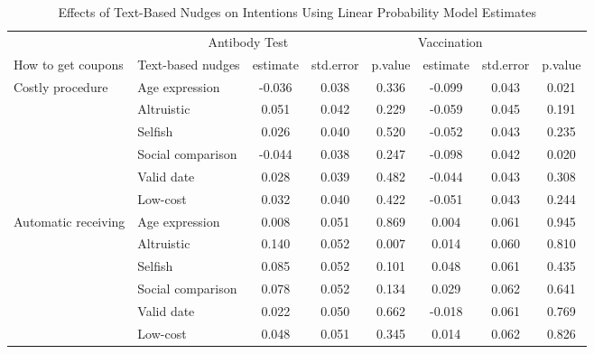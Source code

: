 \documentclass[
  11pt,
  a4paper,
]{article}
\begin{document}
\begin{table}

\caption{\label{tab:int-reg-ftest}Effects of Text-Based Nudges on Intentions Using Linear Probability Model Estimates}
\centering
\begin{tabular}[t]{>{\raggedright\arraybackslash}p{5em}lcccccc}
\toprule
\multicolumn{2}{c}{ } & \multicolumn{3}{c}{Antibody Test} & \multicolumn{3}{c}{Vaccination} \\
\cmidrule(l{3pt}r{3pt}){3-5} \cmidrule(l{3pt}r{3pt}){6-8}
How to get coupons & Text-based nudges & estimate & std.error & p.value & estimate  & std.error  & p.value \\
\midrule
Costly procedure & Age expression & -0.036 & 0.038 & 0.336 & -0.099 & 0.043 & 0.021\\
 & Altruistic & 0.051 & 0.042 & 0.229 & -0.059 & 0.045 & 0.191\\
 & Selfish & 0.026 & 0.040 & 0.520 & -0.052 & 0.043 & 0.235\\
 & Social comparison & -0.044 & 0.038 & 0.247 & -0.098 & 0.042 & 0.020\\
 & Valid date & 0.028 & 0.039 & 0.482 & -0.044 & 0.043 & 0.308\\
 & Low-cost & 0.032 & 0.040 & 0.422 & -0.051 & 0.043 & 0.244\\
Automatic receiving & Age expression & 0.008 & 0.051 & 0.869 & 0.004 & 0.061 & 0.945\\
 & Altruistic & 0.140 & 0.052 & 0.007 & 0.014 & 0.060 & 0.810\\
 & Selfish & 0.085 & 0.052 & 0.101 & 0.048 & 0.061 & 0.435\\
 & Social comparison & 0.078 & 0.052 & 0.134 & 0.029 & 0.062 & 0.641\\
 & Valid date & 0.022 & 0.050 & 0.662 & -0.018 & 0.061 & 0.769\\
 & Low-cost & 0.048 & 0.051 & 0.345 & 0.014 & 0.062 & 0.826\\
\bottomrule
\end{tabular}
\end{table}
\end{document}
